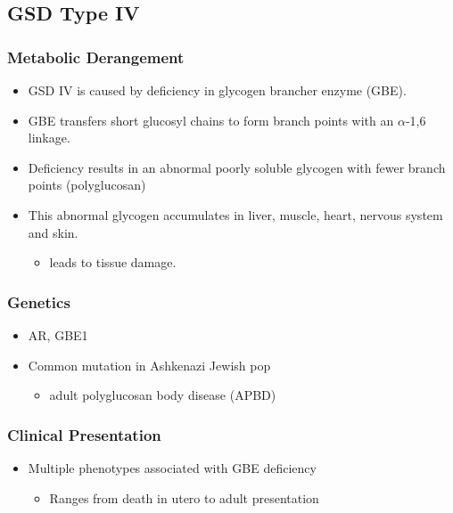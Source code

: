 \documentclass{scrartcl}
\begin{document}
\subsection{GSD Type IV}
\label{sec:org2b237ab}
\subsubsection{Metabolic Derangement}
\label{sec:org7f2179a}
\begin{itemize}
\item GSD IV is caused by deficiency in glycogen brancher enzyme (GBE).
\item GBE transfers short glucosyl chains to form branch points with an
\(\alpha\)-1,6 linkage.
\item Deficiency results in an abnormal poorly soluble glycogen with fewer branch points (polyglucosan)
\item This abnormal glycogen accumulates in liver, muscle, heart, nervous system and skin.
\begin{itemize}
\item leads to tissue damage.
\end{itemize}
\end{itemize}

\subsubsection{Genetics}
\label{sec:org11f204a}
\begin{itemize}
\item AR, GBE1
\item Common mutation in Ashkenazi Jewish pop
\begin{itemize}
\item adult polyglucosan body disease (APBD)
\end{itemize}
\end{itemize}

\subsubsection{Clinical Presentation}
\label{sec:org7307d45}

\begin{itemize}
\item Multiple phenotypes associated with GBE deficiency
\begin{itemize}
\item Ranges from death in utero to adult presentation
\end{itemize}
\end{itemize}
\end{document}

